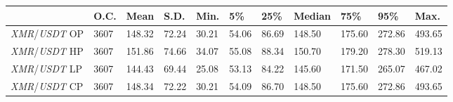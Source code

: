 \begin{tabular}{lllllllllll}
\toprule
 & \textbf{O.C.} & \textbf{Mean} & \textbf{S.D.} & \textbf{Min.} & \textbf{5\%} & \textbf{25\%} & \textbf{Median} & \textbf{75\%} & \textbf{95\%} & \textbf{Max.} \\
\midrule
\emph{XMR}/\emph{USDT} OP & 3607 & 148.32 & 72.24 & 30.21 & 54.06 & 86.69 & 148.50 & 175.60 & 272.86 & 493.65 \\
\emph{XMR}/\emph{USDT} HP & 3607 & 151.86 & 74.66 & 34.07 & 55.08 & 88.34 & 150.70 & 179.20 & 278.30 & 519.13 \\
\emph{XMR}/\emph{USDT} LP & 3607 & 144.43 & 69.44 & 25.08 & 53.13 & 84.22 & 145.60 & 171.50 & 265.07 & 467.02 \\
\emph{XMR}/\emph{USDT} CP & 3607 & 148.34 & 72.22 & 30.21 & 54.09 & 86.70 & 148.50 & 175.60 & 272.86 & 493.65 \\
\bottomrule
\end{tabular}
